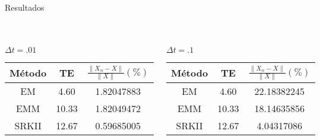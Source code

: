 \begin{bibunit}[aalpha]
\begin{frame}{Resultados \cite{branka1998algorithms}}
\begin{columns}
{		}	
	\end{columns}
\end{frame}
\begin{frame}{}
	\begin{columns}  	
	\begin{block}{$\Delta t=\num{.01}$}
	 	\begin{tabular}{c|c|c}
		  \hline
		  M\'etodo &TE &$\frac{\|X_n-X\|}{\|X\|}(\%)$ \\
		    \hline
		    EM       & \num{4.60}     & \num{1.82047883}\\
		    EMM    & \num{10.33}   & \num{1.82049472}\\
		    SRKII   & \num{12.67}   & \num{0.59685005}\\
		    \hline
		\end{tabular}
	\end{block}
	\begin{exampleblock}{$\Delta t=\num{.1}$}
	 	\begin{tabular}{c|c|c}
		  \hline
		  M\'etodo &TE &$\frac{\|X_n-X\|}{\|X\|}(\%)$ \\
		    \hline
		    EM       &\num{4.60}    &\num{ 22.18382245} \\
        	EMM    &\num{10.33}  &\num{18.14635856}  \\
        	SRKII   &\num{ 12.67} &\num{ 4.04317086 }  \\
		    \hline
		\end{tabular}
	\end{exampleblock}	
		
		

\end{columns}
\end{frame}
\end{bibunit}
